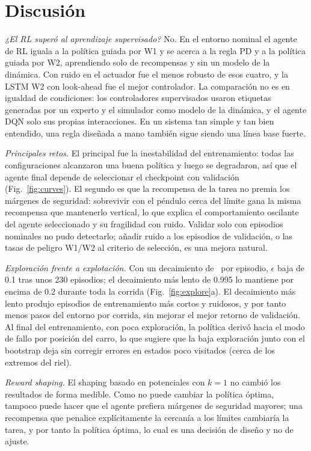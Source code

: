 \documentclass[conference]{IEEEtran}
\begin{document}
\section{Discusión}

\emph{¿El RL superó al aprendizaje supervisado?} No. En el entorno nominal el agente de RL
iguala a la política guiada por W1 y se acerca a la regla PD y a la política guiada por W2,
aprendiendo solo de recompensas y sin un modelo de la dinámica. Con ruido en el actuador fue
el menos robusto de esos cuatro, y la LSTM W2 con look-ahead fue el mejor controlador. La
comparación no es en igualdad de condiciones: los controladores supervisados usaron
etiquetas generadas por un experto y el simulador como modelo de la dinámica, y el agente
DQN solo sus propias interacciones. En un sistema tan simple y tan bien entendido, una regla
diseñada a mano también sigue siendo una línea base fuerte.

\emph{Principales retos.} El principal fue la inestabilidad del entrenamiento: todas las
configuraciones alcanzaron una buena política y luego se degradaron, así que el agente final
depende de seleccionar el checkpoint con validación (Fig.~\ref{fig:curves}). El segundo es que
la recompensa de la tarea no premia los márgenes de seguridad: sobrevivir con el péndulo
cerca del límite gana la misma recompensa que mantenerlo vertical, lo que explica el
comportamiento oscilante del agente seleccionado y su fragilidad con ruido. Validar solo con
episodios nominales no pudo detectarlo; añadir ruido a los episodios de validación, o las
tasas de peligro W1/W2 al criterio de selección, es una mejora natural.

\emph{Exploración frente a explotación.} Con un decaimiento de \EpsDecay\ por episodio,
$\epsilon$ baja de 0.1 tras unos 230 episodios; el decaimiento más lento de 0.995 lo mantiene
por encima de 0.2 durante toda la corrida (Fig.~\ref{fig:explore}a). El decaimiento más lento
produjo episodios de entrenamiento más cortos y ruidosos, y por tanto menos pasos del entorno
por corrida, sin mejorar el mejor retorno de validación. Al final del entrenamiento, con poca
exploración, la política derivó hacia el modo de fallo por posición del carro, lo que sugiere
que la baja exploración junto con el bootstrap deja sin corregir errores en estados poco
visitados (cerca de los extremos del riel).

\emph{Reward shaping.} El shaping basado en potenciales con $k = 1$ no cambió los resultados
de forma medible. Como no puede cambiar la política óptima, tampoco puede hacer que el agente
prefiera márgenes de seguridad mayores; una recompensa que penalice explícitamente la
cercanía a los límites cambiaría la tarea, y por tanto la política óptima, lo cual es una
decisión de diseño y no de ajuste.
\end{document}
